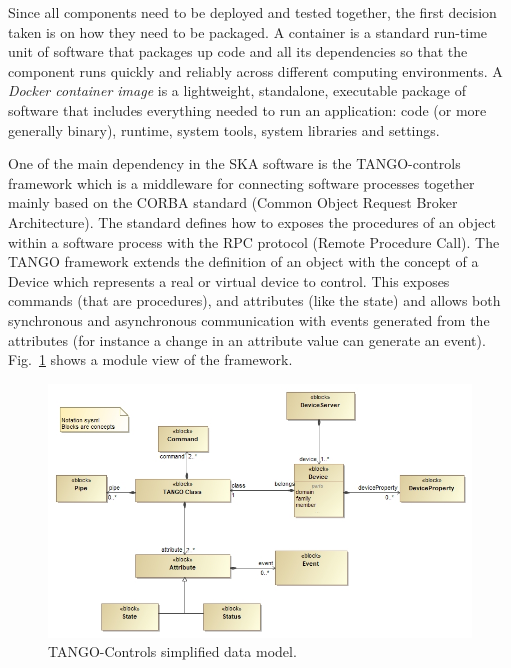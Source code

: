 \documentclass[a4paper,
               keeplastbox,   %
               ]{jacow}
\begin{document}
Since all components need to be deployed and tested together, the first decision taken is on how they need to be packaged. A container is a standard run-time unit of software that packages up code and all its dependencies so that the component runs quickly and reliably across different computing environments. A \textit{Docker container image} is a lightweight, standalone, executable package of software that includes everything needed to run an application: code (or more generally binary), runtime, system tools, system libraries and settings. 

One of the main dependency in the SKA software is the TANGO-controls~\cite{tango-controls} framework which is a middleware for connecting software processes together mainly based on the CORBA standard (Common Object Request Broker Architecture). The standard defines how to exposes the procedures of an object within a software process with the RPC protocol (Remote Procedure Call). The TANGO framework extends the definition of an object with the concept of a Device which represents a real or virtual device to control. This exposes commands (that are procedures), and attributes (like the state) and allows both synchronous and asynchronous communication with events generated from the attributes (for instance a change in an attribute value can generate an event). Fig.~\ref{fig:tangodatamodel} shows a module view of the framework.

\begin{figure}[!htb]
   \centering
   \includegraphics*[width=.7\columnwidth]{SimplifiedDataModel}
   \caption{TANGO-Controls simplified data model.}
   \label{fig:tangodatamodel}
\end{figure}
\end{document}
